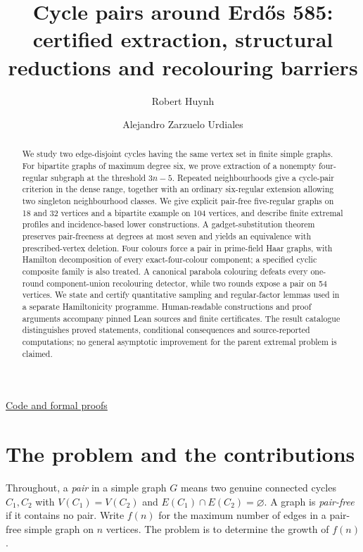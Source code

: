 \documentclass[smallextended]{svjour3}
\title{Cycle pairs around Erdős 585: certified extraction, structural reductions and recolouring barriers}
\author{Robert Huynh\inst{1} \and Alejandro Zarzuelo Urdiales\inst{2}}
\institute{Robert Huynh (corresponding author) \at \href{https://www.hbs.edu/}{Harvard Business School} \and Alejandro Zarzuelo Urdiales \at \href{https://rsihouse.ai/openmath}{Open Math}}
\date{} %
\newcounter{none} %
\begin{document}
\maketitle

\begin{abstract}
We study two edge-disjoint cycles having the same vertex set in finite
simple graphs. For bipartite graphs of maximum degree six, we prove
extraction of a nonempty four-regular subgraph at the threshold
\(3n-5\). Repeated neighbourhoods give a cycle-pair criterion in the
dense range, together with an ordinary six-regular extension allowing
two singleton neighbourhood classes. We give explicit pair-free
five-regular graphs on 18 and 32 vertices and a bipartite example on 104
vertices, and describe finite extremal profiles and incidence-based
lower constructions. A gadget-substitution theorem preserves
pair-freeness at degrees at most seven and yields an equivalence with
prescribed-vertex deletion. Four colours force a pair in prime-field
Haar graphs, with Hamilton decomposition of every exact-four-colour
component; a specified cyclic composite family is also treated. A
canonical parabola colouring defeats every one-round component-union
recolouring detector, while two rounds expose a pair on 54 vertices. We
state and certify quantitative sampling and regular-factor lemmas used
in a separate Hamiltonicity programme. Human-readable constructions and
proof arguments accompany pinned Lean sources and finite certificates.
The result catalogue distinguishes proved statements, conditional
consequences and source-reported computations; no general asymptotic
improvement for the parent extremal problem is claimed.
\end{abstract}

\begin{center}\small\href{https://github.com/alejandrozu/openmath-2026-judging/tree/70c5ec3107658182f22c207d4c50f53f9cb3e602/robert-review-2026-10-07}{Code and formal proofs}\end{center}

\section{The problem and the
contributions}\label{the-problem-and-the-contributions}

Throughout, a \emph{pair} in a simple graph \(G\) means two genuine
connected cycles \(C_1,C_2\) with \(V(C_1)=V(C_2)\) and
\(E(C_1)\cap E(C_2)=\varnothing\). A graph is \emph{pair-free} if it
contains no pair. Write \(f(n)\) for the maximum number of edges in a
pair-free simple graph on \(n\) vertices. The problem is to determine
the growth of \(f(n)\).
\end{document}
